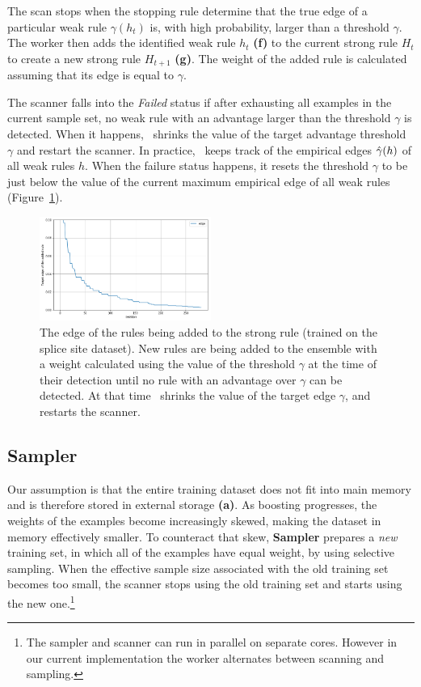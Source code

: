The scan stops when the stopping rule determine that
the true edge of a particular weak rule
$\gamma(h_t)$ is, with high probability,
larger than a threshold $\gamma$. The
worker then adds the identified weak rule $h_t$ {\bf (f)} to the current
strong rule $H_t$ to create a new strong rule $H_{t+1}$ {\bf (g)}.
The weight of the added rule is calculated assuming that its edge is
equal to $\gamma$.

The scanner falls into the \textit{Failed} status if after exhausting
all examples in the current sample set, no weak rule with an advantage
larger than the threshold $\gamma$ is detected.
When it happens, \Sparrow\ shrinks the value of the target advantage
threshold $\gamma$ and restart the scanner.
In practice, \Sparrow\ keeps track of the empirical edges $\hat{\gamma}{(h)}$
of all weak rules $h$.
When the failure status happens, it resets the threshold $\gamma$
to be just below the value of the current maximum empirical edge of
all weak rules (Figure~\ref{fig:edge}).

\begin{figure}
\centering
    \includegraphics[width=0.5\textwidth]{figs/edge.png}
    \caption{The edge of the rules being added to the strong rule
    (trained on the splice site dataset).
    New rules are being added to the ensemble with a weight calculated
    using the value of the threshold $\gamma$ at the time of their
    detection until no rule with an advantage over $\gamma$ can be detected.
    At that time \Sparrow\ shrinks the value of the target edge $\gamma$,
    and restarts the scanner.\label{fig:edge}}
    \vspace{0pt}
\end{figure}


\subsection*{Sampler}

Our assumption is that the entire training dataset does
not fit into main memory and is therefore stored in external storage
{\bf (a)}. As boosting progresses, the weights of the examples become
increasingly skewed, making the dataset in memory effectively smaller.
To counteract that skew, {\bf Sampler} prepares a {\em new}
training set, in which all of the examples have equal weight, by using
selective sampling. When the effective sample size associated
with the old training set becomes too small, the scanner stops using
the old training set and starts using the new one.\footnote{The
  sampler and scanner can run in parallel on separate cores. However in
  our current implementation the worker alternates between scanning and
  sampling.}

